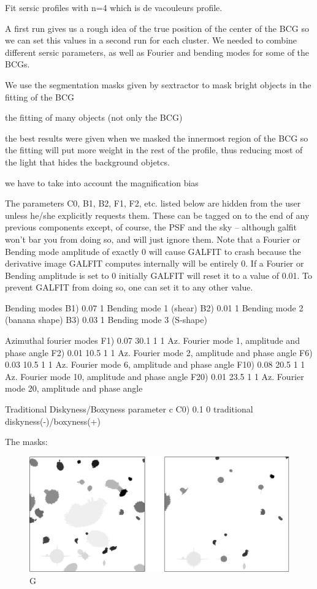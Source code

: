 Fit sersic profiles with n=4 which is de vacouleurs profile. 

A first run gives us a rough idea of the true position of the center of the BCG so we can set this values in a second run for each cluster. We needed to combine different sersic parameters, as well as Fourier and bending modes for some of the BCGs.

We use the segmentation masks given by sextractor to mask bright objects in the fitting of the BCG

the fitting of many objects (not only the BCG)

the best results were given when we masked the innermost region of the BCG so the fitting will put more weight in the rest of the profile, thus reducing most of the light that hides the background objetcs.

we have to take into account the magnification bias

 The parameters C0, B1, B2, F1, F2, etc. listed below are hidden 
 from the user unless he/she explicitly requests them.  These can  be tagged on to the end of any previous components except, of 
 course, the PSF and the sky -- although galfit won't bar you from doing 
 so, and will just ignore them.  Note that a Fourier or Bending mode 
 amplitude of exactly 0 will cause GALFIT to crash because the 
 derivative image GALFIT computes internally will be entirely 0.  If a 
 Fourier or Bending amplitude is set to 0 initially GALFIT will reset it  
 to a value of 0.01.  To prevent GALFIT from doing so, one can set it to any 
 other value.

  Bending modes
B1)  0.07      1        Bending mode 1 (shear)
B2)  0.01      1        Bending mode 2 (banana shape)
B3)  0.03      1        Bending mode 3 (S-shape)

  Azimuthal fourier modes
F1)  0.07  30.1  1  1   Az. Fourier mode 1, amplitude and phase angle
F2)  0.01  10.5  1  1   Az. Fourier mode 2, amplitude and phase angle
F6)  0.03  10.5  1  1  Az. Fourier mode 6, amplitude and phase angle
F10)  0.08  20.5  1  1   Az. Fourier mode 10, amplitude and phase angle
F20)  0.01  23.5  1  1   Az. Fourier mode 20, amplitude and phase angle

  Traditional Diskyness/Boxyness parameter c
C0) 0.1         0       traditional diskyness(-)/boxyness(+)

The masks:

\begin{figure}[H]
\centering
\includegraphics[width=12cm]{images/masks.png}
\caption[M]{G}
\end{figure}

